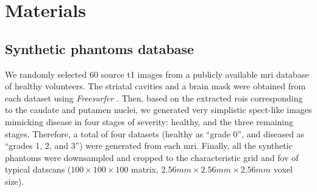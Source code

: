 \documentclass{frontiers}
\begin{document}
\section{Materials}\label{sec:data}
 
\subsection{Synthetic phantoms database} %
\label{sec:data_synthetic}
We randomly selected 60 source \gls*{t1} images from a publicly available
  \gls*{mri} database \citep{hill_ixi_2006} of healthy volunteers.
The striatal cavities and a brain mask were obtained from each dataset
  using \emph{Freesurfer} \citep{fischl_freesurfer_2012}.
Then, based on the extracted \glspl*{roi} corresponding to the caudate and putamen
  nuclei,  we generated very simplistic \gls*{spect}-like images mimicking disease in
  four stages of severity: healthy, and the three remaining stages.
  Therefore, a total of four datasets (healthy as ``grade 0'',
  and diseased as ``grades 1, 2, and 3'') were generated from each \gls*{mri}.
Finally, all the synthetic phantoms were downsampled and cropped to the characteristic
  grid and \acrlong*{fov} of typical \glspl*{datscan} ($100\times100\times100$ matrix,
  $2.56mm\times2.56mm\times2.56mm$ voxel size).
\end{document}
